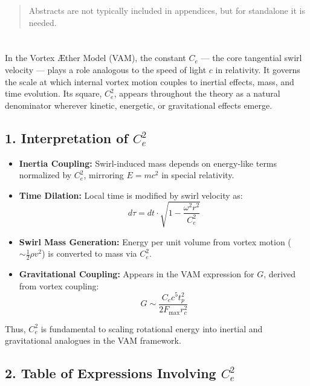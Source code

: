 \documentclass[12pt]{article}
\begin{document}
  \titlepageOpen

  \begin{abstract}
      Abstracts are not typically included in appendices, but for standalone it is needed.
  \end{abstract}

  \titlepageClose
\fi


\section{\appendixtitle}
In the Vortex Æther Model (VAM), the constant \( C_e \) --- the core tangential swirl velocity --- plays a role analogous to the speed of light \( c \) in relativity. It governs the scale at which internal vortex motion couples to inertial effects, mass, and time evolution. Its square, \( C_e^2 \), appears throughout the theory as a natural denominator wherever kinetic, energetic, or gravitational effects emerge.

\subsection*{1. Interpretation of \( C_e^2 \)}

\begin{itemize}
    \item \textbf{Inertia Coupling:} Swirl-induced mass depends on energy-like terms normalized by \( C_e^2 \), mirroring \( E = mc^2 \) in special relativity.
    \item \textbf{Time Dilation:} Local time is modified by swirl velocity as:
    \[ d\tau = dt \cdot \sqrt{1 - \frac{\omega^2 r^2}{C_e^2}} \]

    \item \textbf{Swirl Mass Generation:} Energy per unit volume from vortex motion (\( \sim \frac{1}{2} \rho v^2 \)) is converted to mass via \( C_e^2 \).

    \item \textbf{Gravitational Coupling:} Appears in the VAM expression for \( G \), derived from vortex coupling:
    \[ G \sim \frac{C_e c^5 t_p^2}{2 F_{\text{max}} r_c^2} \]
\end{itemize}

Thus, \( C_e^2 \) is fundamental to scaling rotational energy into inertial and gravitational analogues in the VAM framework.

\subsection*{2. Table of Expressions Involving \( C_e^2 \)}
\end{document}
